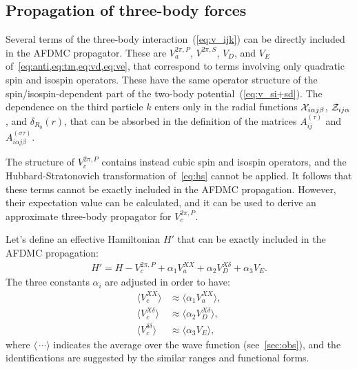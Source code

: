 \documentclass[aps,prc,twocolumn,superscriptaddress,showpacs,floatfix,nofootinbib]{revtex4-1}
\begin{document}
\subsection{Propagation of three-body forces}
\label{sec:p3}
Several terms of the three-body interaction~(\ref{eq:v_ijk}) can be directly included in the AFDMC propagator. 
These are $V_a^{2\pi,P}$, $V^{2\pi,S}$, $V_D$, and $V_E$ of~\cref{eq:anti,eq:tm,eq:vd,eq:ve},
that correspond to terms involving only quadratic spin and isospin operators.
These have the same operator structure of the spin/isospin-dependent part of the
two-body potential~(\ref{eq:v_si+sd}). The dependence on the third particle $k$ enters only in the radial
functions ${\cal X}_{i\alpha j\beta}$, ${\cal Z}_{ij\alpha}$, and $\delta_{R_0}(r)$,
that can be absorbed in the definition of the
matrices $A^{(\tau)}_{ij}$ and $A^{(\sigma\tau)}_{i\alpha j\beta}$.

The structure of $V_c^{2\pi,P}$ contains instead cubic spin and isospin operators, 
and the Hubbard-Stratonovich transformation of~\cref{eq:hs} cannot be applied.
It follows that these terms cannot be exactly included in the AFDMC propagation.
However, their expectation value can be calculated, and it can be used to derive
an approximate three-body propagator for $V_c^{2\pi,P}$.

Let's define an effective Hamiltonian $H'$ that can be exactly included in 
the AFDMC propagation:
\begin{align}
H'=H-V_c^{2\pi,P}+\alpha_1 V_a^{XX}+\alpha_2 V_D^{X\delta}+\alpha_3 V_E .
\label{eq:h'}
\end{align}
The three constants $\alpha_i$ are adjusted in order to have:
\begin{align}
\langle V_c^{XX}\rangle & \approx\langle\alpha_1 V_a^{XX}\rangle , \nonumber \\
\langle V_c^{X\delta}\rangle & \approx\langle\alpha_2 V_D^{X\delta}\rangle , \nonumber  \\
\langle V_c^{\delta\delta}\rangle & \approx\langle\alpha_3 V_E\rangle , 
\label{eq:pert}
\end{align}
where $\langle\,\cdots\rangle$ indicates the average over the wave function
(see~\cref{sec:obs}), and the identifications are suggested by the similar 
ranges and functional forms.
\end{document}
